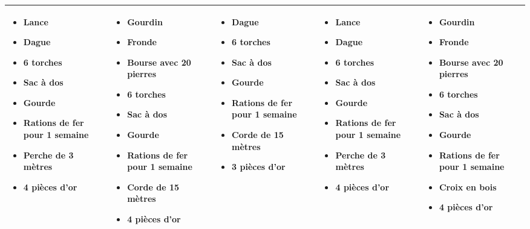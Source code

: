 \begin{tabularx}{\textwidth}{|X|X|X|X|X|}
  \begin{itemize}
    \item Lance
    \item Dague
    \item 6 torches
    \item Sac à dos
    \item Gourde
    \item Rations de fer pour 1 semaine
    \item Perche de 3 mètres
    \item 4 pièces d'or
  \end{itemize}
  &
  \begin{itemize}
    \item Gourdin
    \item Fronde
    \item Bourse avec 20 pierres
    \item 6 torches
    \item Sac à dos
    \item Gourde
    \item Rations de fer pour 1 semaine
    \item Corde de 15 mètres
    \item 4 pièces d'or
  \end{itemize}
  &
  \begin{itemize}
    \item Dague
    \item 6 torches
    \item Sac à dos
    \item Gourde
    \item Rations de fer pour 1 semaine
    \item Corde de 15 mètres
    \item 3 pièces d'or
  \end{itemize}
  &
  \begin{itemize}
    \item Lance
    \item Dague
    \item 6 torches
    \item Sac à dos
    \item Gourde
    \item Rations de fer pour 1 semaine
    \item Perche de 3 mètres
    \item 4 pièces d'or
  \end{itemize}
  &
  \begin{itemize}
    \item Gourdin
    \item Fronde
    \item Bourse avec 20 pierres
    \item 6 torches
    \item Sac à dos
    \item Gourde
    \item Rations de fer pour 1 semaine
    \item Croix en bois
    \item 4 pièces d'or
  \end{itemize}
  \\\hline


\end{tabularx}
